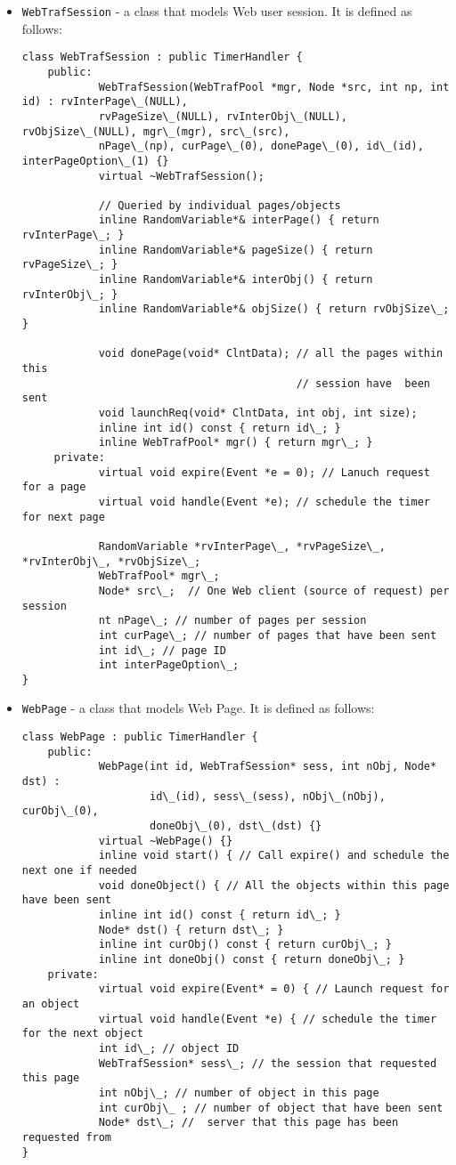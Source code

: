 \begin{itemize}
\item {\tt WebTrafSession} - a class that models Web user session. It is defined as follows:
\begin{verbatim}
class WebTrafSession : public TimerHandler {
	public:   
	        WebTrafSession(WebTrafPool *mgr, Node *src, int np, int id) : rvInterPage\_(NULL),
	        rvPageSize\_(NULL), rvInterObj\_(NULL), rvObjSize\_(NULL), mgr\_(mgr), src\_(src), 
	        nPage\_(np), curPage\_(0), donePage\_(0), id\_(id), interPageOption\_(1) {} 
	        virtual ~WebTrafSession();

	        // Queried by individual pages/objects
	        inline RandomVariable*& interPage() { return rvInterPage\_; }
	        inline RandomVariable*& pageSize() { return rvPageSize\_; }
	        inline RandomVariable*& interObj() { return rvInterObj\_; }
	        inline RandomVariable*& objSize() { return rvObjSize\_; }
		
	        void donePage(void* ClntData); // all the pages within this
	                                       // session have  been sent
	        void launchReq(void* ClntData, int obj, int size);
	        inline int id() const { return id\_; }
	        inline WebTrafPool* mgr() { return mgr\_; }
	 private:
	        virtual void expire(Event *e = 0); // Lanuch request for a page
	        virtual void handle(Event *e); // schedule the timer for next page

	        RandomVariable *rvInterPage\_, *rvPageSize\_, *rvInterObj\_, *rvObjSize\_;
	        WebTrafPool* mgr\_;
	        Node* src\_;  // One Web client (source of request) per session
	        nt nPage\_; // number of pages per session
	        int curPage\_; // number of pages that have been sent
	        int id\_; // page ID
	        int interPageOption\_;
}
\end{verbatim}
\item {\tt WebPage} - a class that models Web Page. It is defined as follows:
\begin{verbatim}
class WebPage : public TimerHandler {
	public:
	        WebPage(int id, WebTrafSession* sess, int nObj, Node* dst) :
	                id\_(id), sess\_(sess), nObj\_(nObj), curObj\_(0),
	                doneObj\_(0), dst\_(dst) {}
	        virtual ~WebPage() {}
	        inline void start() { // Call expire() and schedule the next one if needed     
	        void doneObject() { // All the objects within this page have been sent
	        inline int id() const { return id\_; }
	        Node* dst() { return dst\_; }
	        inline int curObj() const { return curObj\_; }
	        inline int doneObj() const { return doneObj\_; }
	private:  
	        virtual void expire(Event* = 0) { // Launch request for an object
	        virtual void handle(Event *e) { // schedule the timer for the next object
	        int id\_; // object ID
	        WebTrafSession* sess\_; // the session that requested this page
	        int nObj\_; // number of object in this page
	        int curObj\_ ; // number of object that have been sent
	        Node* dst\_; //  server that this page has been requested from
}
\end{verbatim}
\end{itemize}

